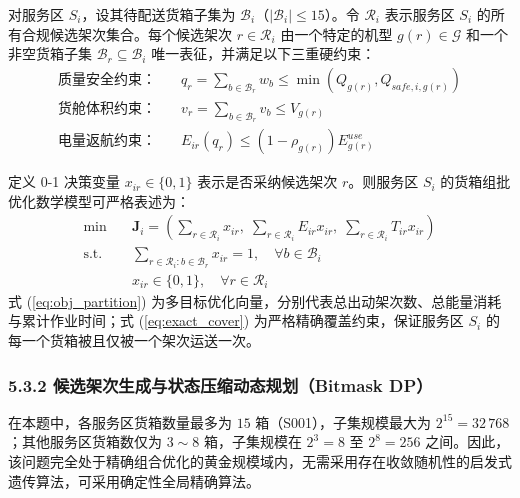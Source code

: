 \documentclass[withoutpreface,bwprint]{format}
\begin{document}
对服务区 $S_i$，设其待配送货箱子集为 $\mathcal{B}_i$（$|\mathcal{B}_i| \le 15$）。令 $\mathcal{R}_i$ 表示服务区 $S_i$ 的所有合规候选架次集合。每个候选架次 $r \in \mathcal{R}_i$ 由一个特定的机型 $g(r) \in \mathcal{G}$ 和一个非空货箱子集 $\mathcal{B}_r \subseteq \mathcal{B}_i$ 唯一表征，并满足以下三重硬约束：
\begin{align}
\text{质量安全约束：} \quad & q_r = \sum_{b \in \mathcal{B}_r} w_b \le \min\left(Q_{g(r)}, Q_{safe, i, g(r)}\right) \\
\text{货舱体积约束：} \quad & v_r = \sum_{b \in \mathcal{B}_r} v_b \le V_{g(r)} \\
\text{电量返航约束：} \quad & E_{ir}(q_r) \le (1 - \rho_{g(r)}) E_{g(r)}^{use}
\end{align}

定义 0-1 决策变量 $x_{ir} \in \{0, 1\}$ 表示是否采纳候选架次 $r$。则服务区 $S_i$ 的货箱组批优化数学模型可严格表述为：
\begin{align}
\min \quad & \bm{J}_i = \left( \sum_{r \in \mathcal{R}_i} x_{ir}, \; \sum_{r \in \mathcal{R}_i} E_{ir} x_{ir}, \; \sum_{r \in \mathcal{R}_i} T_{ir} x_{ir} \right) \label{eq:obj_partition} \\
\text{s.t.} \quad & \sum_{r \in \mathcal{R}_i : b \in \mathcal{B}_r} x_{ir} = 1, \quad \forall b \in \mathcal{B}_i \label{eq:exact_cover} \\
& x_{ir} \in \{0, 1\}, \quad \forall r \in \mathcal{R}_i
\end{align}
式 (\ref{eq:obj_partition}) 为多目标优化向量，分别代表总出动架次数、总能量消耗与累计作业时间；式 (\ref{eq:exact_cover}) 为严格精确覆盖约束，保证服务区 $S_i$ 的每一个货箱被且仅被一个架次运送一次。

\subsubsection{5.3.2 候选架次生成与状态压缩动态规划（Bitmask DP）}
在本题中，各服务区货箱数量最多为 $15$ 箱（S001），子集规模最大为 $2^{15} = 32\,768$；其他服务区货箱数仅为 $3\sim 8$ 箱，子集规模在 $2^3 = 8$ 至 $2^8 = 256$ 之间。因此，该问题完全处于精确组合优化的黄金规模域内，无需采用存在收敛随机性的启发式遗传算法，可采用确定性全局精确算法。
\end{document}
